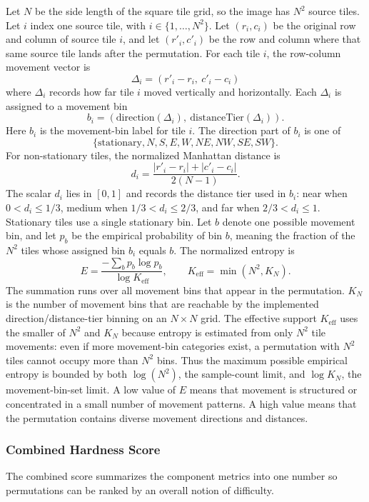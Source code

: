 \documentclass[12pt]{article}
\begin{document}
Let $N$ be the side length of the square tile grid, so the image has $N^2$ source tiles. Let $i$ index one source tile, with $i \in \{1,\ldots,N^2\}$. Let $(r_i, c_i)$ be the original row and column of source tile $i$, and let $(r'_i, c'_i)$ be the row and column where that same source tile lands after the permutation. For each tile $i$, the row-column movement vector is
\[
\Delta_i = (r'_i-r_i,\ c'_i-c_i)
\]
where $\Delta_i$ records how far tile $i$ moved vertically and horizontally. Each $\Delta_i$ is assigned to a movement bin
\[
b_i = (\mathrm{direction}(\Delta_i),\ \mathrm{distanceTier}(\Delta_i)).
\]
Here $b_i$ is the movement-bin label for tile $i$. The direction part of $b_i$ is one of
\[
\{\mathrm{stationary}, N, S, E, W, NE, NW, SE, SW\}.
\]
For non-stationary tiles, the normalized Manhattan distance is
\[
d_i = \frac{|r'_i-r_i| + |c'_i-c_i|}{2(N-1)}.
\]
The scalar $d_i$ lies in $[0,1]$ and records the distance tier used in $b_i$: near when $0 < d_i \leq 1/3$, medium when $1/3 < d_i \leq 2/3$, and far when $2/3 < d_i \leq 1$. Stationary tiles use a single stationary bin. Let $b$ denote one possible movement bin, and let $p_b$ be the empirical probability of bin $b$, meaning the fraction of the $N^2$ tiles whose assigned bin $b_i$ equals $b$. The normalized entropy is
\[
E = \frac{-\sum_b p_b \log p_b}{\log K_{\mathrm{eff}}}, \qquad
K_{\mathrm{eff}} = \min(N^2, K_N).
\]
The summation runs over all movement bins that appear in the permutation. $K_N$ is the number of movement bins that are reachable by the implemented direction/distance-tier binning on an $N \times N$ grid. The effective support $K_{\mathrm{eff}}$ uses the smaller of $N^2$ and $K_N$ because entropy is estimated from only $N^2$ tile movements: even if more movement-bin categories exist, a permutation with $N^2$ tiles cannot occupy more than $N^2$ bins. Thus the maximum possible empirical entropy is bounded by both $\log(N^2)$, the sample-count limit, and $\log K_N$, the movement-bin-set limit. A low value of $E$ means that movement is structured or concentrated in a small number of movement patterns. A high value means that the permutation contains diverse movement directions and distances.

\subsubsection{Combined Hardness Score}

The combined score summarizes the component metrics into one number so permutations can be ranked by an overall notion of difficulty.
\end{document}
